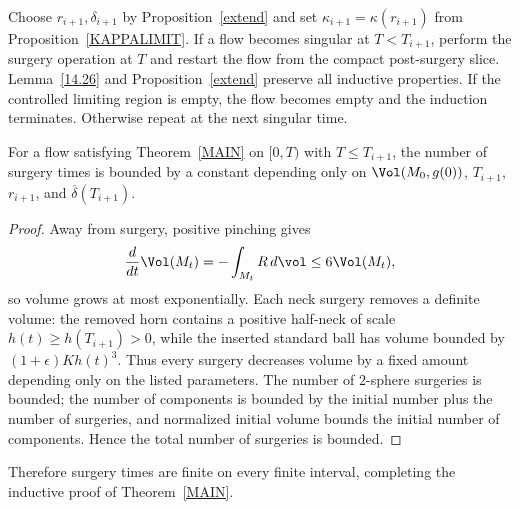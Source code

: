 Choose $r_{i+1},\delta_{i+1}$ by Proposition~\ref{extend} and set
$\kappa_{i+1}=\kappa(r_{i+1})$ from Proposition~\ref{KAPPALIMIT}. If a flow
becomes singular at $T<T_{i+1}$, perform the surgery operation at $T$ and
restart the flow from the compact post-surgery slice. Lemma~\ref{14.26} and
Proposition~\ref{extend} preserve all inductive properties. If the controlled
limiting region is empty, the flow becomes empty and the induction terminates.
Otherwise repeat at the next singular time.

\begin{lemma}
\label{lem:bounded-number-of-surgeries}
\label{bddsurgery}
For a flow satisfying Theorem~\ref{MAIN} on $[0,T)$ with $T\leq T_{i+1}$,
the number of surgery times is bounded by a constant depending only on
$\Vol(M_0,g(0))$, $T_{i+1}$, $r_{i+1}$, and
$\overline\delta(T_{i+1})$.
\end{lemma}

\begin{proof}
\sketch
{}
Away from surgery, positive pinching gives
\[
  \frac{d}{dt}\Vol(M_t)=-\int_{M_t}R\,d\vol\leq6\Vol(M_t),
\]
so volume grows at most exponentially. Each neck surgery removes a definite
volume: the removed horn contains a positive half-neck of scale
$h(t)\geq h(T_{i+1})>0$, while the inserted standard ball has volume bounded by
$(1+\epsilon)Kh(t)^3$. Thus every surgery decreases volume by a fixed amount
depending only on the listed parameters. The number of $2$-sphere surgeries is
bounded; the number of components is bounded by the initial number plus the
number of surgeries, and normalized initial volume bounds the initial number of
components. Hence the total number of surgeries is bounded.
\end{proof}

Therefore surgery times are finite on every finite interval, completing the
inductive proof of Theorem~\ref{MAIN}.

